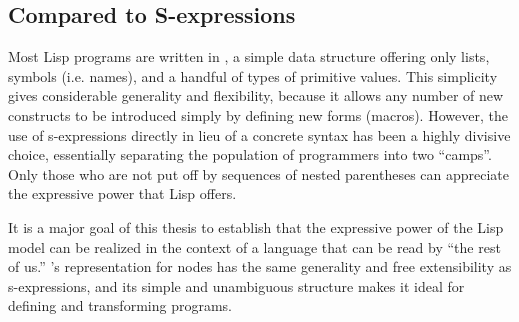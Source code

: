 \subsection{Compared to S-expressions}
Most Lisp programs are written in , a simple data structure offering only lists, symbols (i.e. names), and a handful of types of primitive values. This simplicity gives considerable generality and flexibility, because it allows any number of new constructs to be introduced simply by defining new forms (macros). However, the use of s-expressions directly in lieu of a concrete syntax has been a highly divisive choice, essentially separating the population of programmers into two ``camps''. Only those who are not put off by sequences of nested parentheses can appreciate the expressive power that Lisp offers.

It is a major goal of this thesis to establish that the expressive power of the Lisp model can be realized in the context of a language that can be read by ``the rest of us.'' \Meta's representation for nodes has the same generality and free extensibility as s-expressions, and its simple and unambiguous structure makes it ideal for defining and transforming programs.


